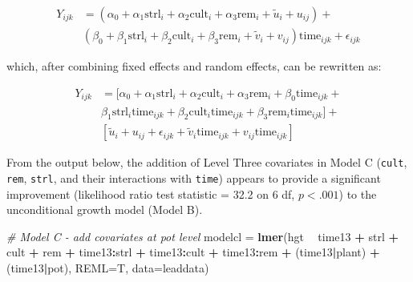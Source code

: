 \documentclass[
]{krantz}
\newenvironment{Shaded}{\begin{snugshade}}{\end{snugshade}}
\newcommand{\CommentTok}[1]{\textcolor[rgb]{0.37,0.37,0.37}{\textit{#1}}}
\newcommand{\DataTypeTok}[1]{\textcolor[rgb]{0.27,0.27,0.27}{#1}}
\newcommand{\KeywordTok}[1]{\textcolor[rgb]{0.27,0.27,0.27}{\textbf{#1}}}
\newcommand{\NormalTok}[1]{#1}
\newcommand{\OperatorTok}[1]{\textcolor[rgb]{0.43,0.43,0.43}{\textbf{#1}}}
\newcommand{\StringTok}[1]{\textcolor[rgb]{0.5,0.5,0.5}{#1}}
\begin{document}
\begin{align*}
Y_{ijk} & = (\alpha_{0}+\alpha_{1}\textrm{strl}_{i}+\alpha_{2}\textrm{cult}_{i}+\alpha_{3}\textrm{rem}_{i}+\tilde{u}_{i}+u_{ij}) + \\
 & (\beta_{0}+\beta_{1}\textrm{strl}_{i}+\beta_{2}\textrm{cult}_{i}+\beta_{3}\textrm{rem}_{i}+\tilde{v}_{i}+
 v_{ij})\textrm{time}_{ijk}+\epsilon_{ijk} 
\end{align*}

which, after combining fixed effects and random effects, can be rewritten as:

\begin{align*}
Y_{ijk} & = [\alpha_{0}+\alpha_{1}\textrm{strl}_{i}+\alpha_{2}\textrm{cult}_{i}+\alpha_{3}\textrm{rem}_{i} +
 \beta_{0}\textrm{time}_{ijk} + \\
 & \beta_{1}\textrm{strl}_{i}\textrm{time}_{ijk}+\beta_{2}\textrm{cult}_{i}\textrm{time}_{ijk}+ \beta_{3}\textrm{rem}_{i}\textrm{time}_{ijk}] + \\
 & [\tilde{u}_{i}+u_{ij}+\epsilon_{ijk}+\tilde{v}_{i}\textrm{time}_{ijk}+v_{ij}\textrm{time}_{ijk}]
\end{align*}

From the output below, the addition of Level Three covariates in Model C (\texttt{cult}, \texttt{rem}, \texttt{strl}, and their interactions with \texttt{time}) appears to provide a significant improvement (likelihood ratio test statistic = 32.2 on 6 df, \(p<.001\)) to the unconditional growth model (Model B).

\begin{Shaded}
\begin{Highlighting}[]
\CommentTok{# Model C - add covariates at pot level}
\NormalTok{modelcl =}\StringTok{ }\KeywordTok{lmer}\NormalTok{(hgt }\OperatorTok{~}\StringTok{ }\NormalTok{time13 }\OperatorTok{+}\StringTok{ }\NormalTok{strl }\OperatorTok{+}\StringTok{ }\NormalTok{cult }\OperatorTok{+}\StringTok{ }\NormalTok{rem }\OperatorTok{+}\StringTok{ }
\StringTok{    }\NormalTok{time13}\OperatorTok{:}\NormalTok{strl }\OperatorTok{+}\StringTok{ }\NormalTok{time13}\OperatorTok{:}\NormalTok{cult }\OperatorTok{+}\StringTok{ }\NormalTok{time13}\OperatorTok{:}\NormalTok{rem }\OperatorTok{+}\StringTok{ }\NormalTok{(time13}\OperatorTok{|}\NormalTok{plant) }\OperatorTok{+}
\StringTok{    }\NormalTok{(time13}\OperatorTok{|}\NormalTok{pot), }\DataTypeTok{REML=}\NormalTok{T, }\DataTypeTok{data=}\NormalTok{leaddata)}
\end{Highlighting}
\end{Shaded}
\end{document}
